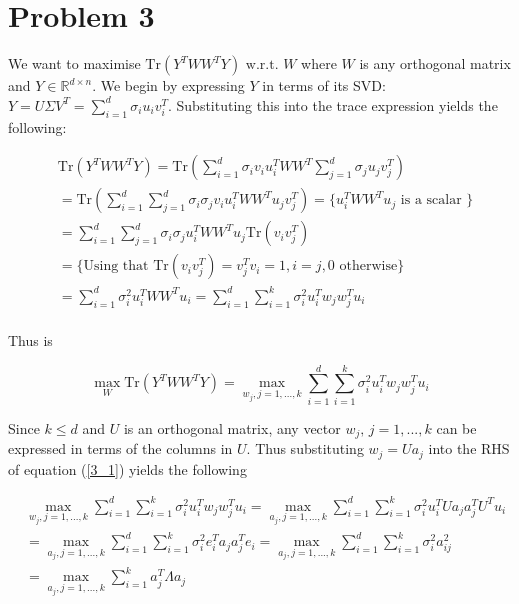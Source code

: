 \section*{Problem 3}


We want to maximise $\text{Tr}(Y^T W W^T Y) \text{ w.r.t. } W$ where $W$ is any orthogonal matrix and $Y \in \mathbb{R}^{d \times n} $. We begin by expressing $Y$ in terms of its SVD: $Y = U \Sigma V^T = \sum_{i = 1}^d \sigma_i u_i v_i^T$. Substituting this into the trace expression yields the following:

\begin{align}
  & \text{Tr}(Y^T W W^T Y) = \text{Tr}(\sum_{i = 1}^d \sigma_i v_i u_i^T W W^T \sum_{j = 1}^d \sigma_j u_j v_j^T)\\
  & = \text{Tr}(\sum_{i = 1}^d \sum_{j = 1}^d \sigma_i \sigma_j v_i u_i^T W W^T u_j v_j^T) = \bigg\{ u_i^T W W^T u_j \text{ is a scalar } \bigg\} \\
  & = \sum_{i = 1}^d \sum_{j = 1}^d \sigma_i \sigma_j  u_i^T W W^T u_j \text{Tr} (v_i v_j^T) \\
  & = \bigg\{ \text{Using that Tr}(v_i v_j^T) = v_j^T v_i = 1, i = j, 0 \text{ otherwise} \bigg\} \\
  & = \sum_{i = 1}^d\sigma_i^2 u_i^T W W^T u_i = \sum_{i = 1}^d\sum_{i = 1}^k\sigma_i^2 u_i^T w_j w_j^T u_i \\
\end{align}

Thus is

\begin{equation}
  \max_W \text{Tr}(Y^T W W^T Y) = \max_{w_j, j = 1,..., k} \sum_{i = 1}^d\sum_{i = 1}^k\sigma_i^2 u_i^T w_j w_j^T u_i
  \label{3_1}
\end{equation}

Since $k \leq d $ and $U$ is an orthogonal matrix, any vector $w_j, \, j = 1,..., k$ can be expressed in terms of the columns in $U$. Thus substituting $w_j = U a_j$ into the RHS of equation (\ref{3_1}) yields the following

\begin{align}
  & \max_{w_j, j = 1,..., k} \sum_{i = 1}^d\sum_{i = 1}^k\sigma_i^2 u_i^T w_j w_j^T u_i = \max_{a_j, j = 1,..., k} \sum_{i = 1}^d\sum_{i = 1}^k\sigma_i^2 u_i^T U a_j a_j^T U^T u_i \\
  & = \max_{a_j, j = 1,..., k} \sum_{i = 1}^d\sum_{i = 1}^k\sigma_i^2 e^T_i a_j a_j^T e_i = \max_{a_j, j = 1,..., k} \sum_{i = 1}^d\sum_{i = 1}^k\sigma_i^2 a_{ij}^2 \\
  & = \max_{a_j, j = 1,..., k} \sum_{i = 1}^k a_j^T \Lambda a_j 
\end{align}
